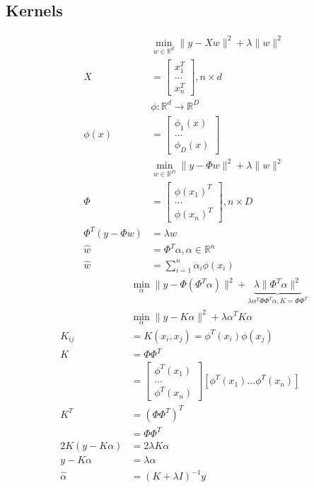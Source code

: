 \documentclass{article}
\begin{document}
\subsection{Kernels}
\begin{align*}
&  \displaystyle\min_{w \in \mathbb{R}^{d}} \| y - X w \|^{2} + \lambda \| w \|^{2}
\\ X  &= \begin{bmatrix} x_{1}^{T} \\ ... \\ x_{n}^{T} \end{bmatrix}, n  \times d 
\\ &  \phi: \mathbb{R}^{d} \to  \mathbb{R}^{D}
\\ \phi\left(x\right) &= \begin{bmatrix} \phi_{1}\left(x\right) \\ ... \\ \phi_{D}\left(x\right) \end{bmatrix}
\\ &  \displaystyle\min_{w \in \mathbb{R}^{D}} \| y - \Phi w \|^{2} + \lambda \| w \|^{2}
\\ \Phi &= \begin{bmatrix} \phi\left(x_{1}\right)^{T} \\ ... \\ \phi\left(x_{n}\right)^{T} \end{bmatrix}, n \times D 
\\ \Phi^{T} \left(y - \Phi w\right) &= \lambda w 
\\ \hat{w} &= \Phi^{T} \alpha, \alpha \in \mathbb{R}^{n}
\\ \hat{w} &= \displaystyle\sum_{i=1}^{n} \alpha_{i} \phi\left(x_{i}\right)
\end{align*}
\begin{align*}
&  \displaystyle\min_{\alpha} \| y - \Phi\left(\Phi^{T} \alpha\right) \|^{2} + \underbrace{\lambda \| \Phi^{T} \alpha \|^{2}}_{\lambda \alpha^{T} \Phi \Phi^{T} \alpha, K = \Phi \Phi^{T}}
\\ &  \displaystyle\min_{\alpha} \| y - K \alpha \|^{2} + \lambda \alpha^{T} K \alpha
\\ K_{ij} &= K\left(x_{i}, x_{j}\right) = \phi^{T}\left(x_{i}\right) \phi\left(x_{j}\right)
\\ K  &= \Phi \Phi^{T}
\\ &= \begin{bmatrix} \phi^{T}\left(x_{1}\right) \\ ... \\ \phi^{T}\left(x_{n}\right) \end{bmatrix} \left[\phi^{T}\left(x_{1}\right) ... \phi^{T}\left(x_{n}\right)\right]
\\ K^{T}  &= \left(\Phi \Phi^{T}\right)^{T}
\\ &= \Phi \Phi^{T}
\\ 2 K \left(y - K \alpha\right) &= 2 \lambda K \alpha
\\ y  - K \alpha &= \lambda \alpha
\\ \hat{\alpha} &= \left(K + \lambda I\right)^{-1} y 
\end{align*}
\end{document}
